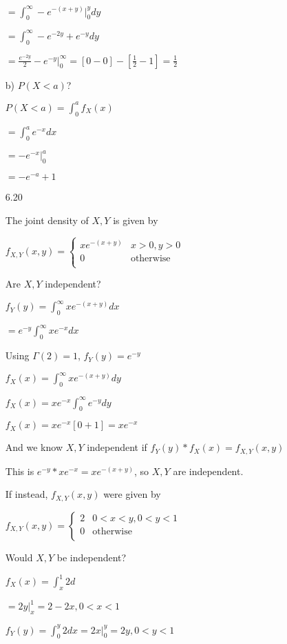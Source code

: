 \documentclass[11pt]{article}
\begin{document}
\begin{itemize}
		$= \int_{0}^{\infty} -e^{-(x+y)}|_0^y dy$

		$= \int_{0}^{\infty} -e^{-2y} + e^{-y} dy$

		$= \frac{e^{-2y}}{2} - e^{-y}|_{0}^{\infty} = [0 - 0] - [\frac{1}{2} - 1] = \frac{1}{2}$

	b) $P(X < a)$?

		$P(X < a) = \int_{0}^{a} f_X(x)$ 

		$= \int_{0}^{a} e^{-x} dx$

		$= -e^{-x}|_{0}^{a}$

		$= -e^{-a} + 1$

\item[6.20]

	The joint density of $X,Y$ is given by

		$f_{X,Y} (x,y) = \begin{cases}
			xe^{-(x+y)} & x > 0, y > 0\\

			0 & \text{otherwise}\\

		\end{cases}$

	Are $X,Y$ independent? 

		$f_Y(y) = \int_{0}^{\infty} xe^{-(x+y)}dx$

		$= e^{-y}\int_{0}^{\infty} xe^{-x} dx$

		Using $\Gamma(2) = 1$, $f_Y(y) = e^{-y}$

		$f_X(x) = \int_{0}^{\infty} xe^{-(x+y)}dy$

		$f_X(x) = xe^{-x} \int_{0}^{\infty} e^{-y} dy$

		$f_X(x) = xe^{-x}[0 + 1] = xe^{-x}$

		And we know $X,Y$ independent if $f_Y(y) * f_X(x) = f_{X,Y}(x,y)$

		This is $e^{-y} * xe^{-x} = xe^{-(x+y)}$, so $X,Y$ are independent.
		
	If instead, $f_{X,Y}(x,y)$ were given by

		$f_{X,Y} (x,y) = \begin{cases}
			2 & 0 < x < y, 0 <y < 1\\
			0 & \text{otherwise}\\
		\end{cases}$

	Would $X,Y$ be independent?

	$f_X(x) = \int_{x}^{1} 2 d$

	$ = 2y |_{x}^{1} = 2 - 2x, 0 < x < 1$

	$f_Y(y) = \int_{0}^{y} 2dx = 2x|_{0}^{y} = 2y, 0 < y < 1$


\end{itemize}
\end{document}

